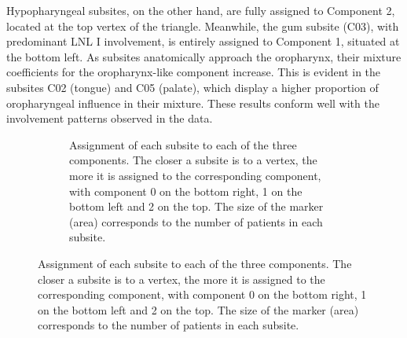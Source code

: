 \documentclass[
  sn-mathphys-num,
]{sn-jnl}
\begin{document}
Hypopharyngeal subsites, on the other hand, are fully assigned to
Component 2, located at the top vertex of the triangle. Meanwhile, the
gum subsite (C03), with predominant LNL I involvement, is entirely
assigned to Component 1, situated at the bottom left. As subsites
anatomically approach the oropharynx, their mixture coefficients for the
oropharynx-like component increase. This is evident in the subsites C02
(tongue) and C05 (palate), which display a higher proportion of
oropharyngeal influence in their mixture. These results conform well
with the involvement patterns observed in the data.

\begin{figure}

\begin{minipage}{0.71\linewidth}

\begin{figure}[H]


\caption{\label{fig-3_simplex}Assignment of each subsite to each of the
three components. The closer a subsite is to a vertex, the more it is
assigned to the corresponding component, with component 0 on the bottom
right, 1 on the bottom left and 2 on the top. The size of the marker
(area) corresponds to the number of patients in each subsite.}


\end{figure}
\end{minipage}
\end{figure}
\end{document}
